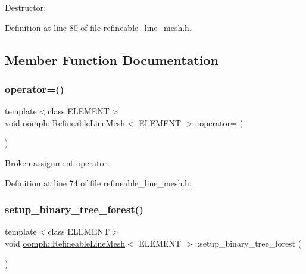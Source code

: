 Destructor\+: 



Definition at line 80 of file refineable\+\_\+line\+\_\+mesh.\+h.



\subsection{Member Function Documentation}
\mbox{\label{classoomph_1_1RefineableLineMesh_a42040861eecb75e09f5e0401212d57a1}} 
\subsubsection{\texorpdfstring{operator=()}{operator=()}}
{\footnotesize\ttfamily template$<$class E\+L\+E\+M\+E\+NT$>$ \\
void \hyperlink{classoomph_1_1RefineableLineMesh}{oomph\+::\+Refineable\+Line\+Mesh}$<$ E\+L\+E\+M\+E\+NT $>$\+::operator= (\begin{DoxyParamCaption}\item[{const \hyperlink{classoomph_1_1RefineableLineMesh}{Refineable\+Line\+Mesh}$<$ E\+L\+E\+M\+E\+NT $>$ \&}]{ }\end{DoxyParamCaption})\hspace{0.3cm}{\ttfamily [inline]}}



Broken assignment operator. 



Definition at line 74 of file refineable\+\_\+line\+\_\+mesh.\+h.

\mbox{\label{classoomph_1_1RefineableLineMesh_ac87ad1a1be6f9a9e444acea2e42598ff}} 
\subsubsection{\texorpdfstring{setup\+\_\+binary\+\_\+tree\+\_\+forest()}{setup\_binary\_tree\_forest()}}
{\footnotesize\ttfamily template$<$class E\+L\+E\+M\+E\+NT$>$ \\
void \hyperlink{classoomph_1_1RefineableLineMesh}{oomph\+::\+Refineable\+Line\+Mesh}$<$ E\+L\+E\+M\+E\+NT $>$\+::setup\+\_\+binary\+\_\+tree\+\_\+forest (\begin{DoxyParamCaption}{ }\end{DoxyParamCaption})\hspace{0.3cm}{\ttfamily [inline]}}

